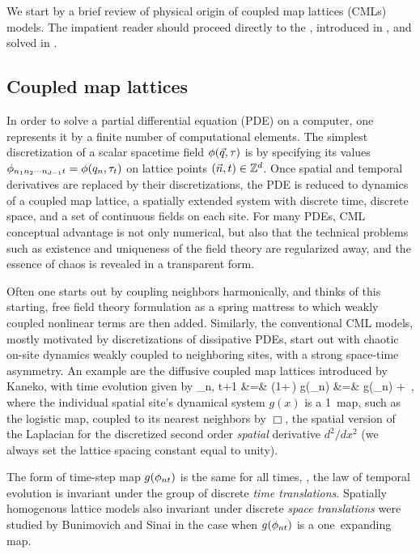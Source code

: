 We start by a
brief review of physical origin of coupled map lattices (CMLs) models.
The impatient reader should proceed directly to the
{\catlatt}, introduced in , and solved in
.

\subsection{Coupled map lattices}
\label{s:CCMs}

In order to solve a partial differential equation (PDE) on a computer,
one represents it by a finite number
of computational elements. The simplest discretization of a scalar
spacetime field $\phi(\vec{q},\tau)$ is by specifying its values
$\phi_{n_1n_2\cdots{n_{d-1}}t}= \phi(q_n,\tau_t)$ on lattice points
$(\vec{n},t) \in \mathbb{Z}^{d}$. Once spatial and temporal derivatives
are replaced by their discretizations, the PDE is
reduced to dynamics of a coupled map lattice, a spatially extended system
with discrete time, discrete space, and a set of continuous fields
on each site. For many PDEs, CML conceptual advantage is not only numerical,
but also that the technical problems such as existence and uniqueness of
the field theory are regularized away, and the essence of {\spt} chaos is
revealed in a transparent form.

Often one starts out by coupling neighbors harmonically, and
thinks of this starting, free field theory formulation as a spring
mattress to which  weakly coupled nonlinear terms are then
added. Similarly, the conventional CML models, mostly motivated by
discretizations of dissipative PDEs, start out with chaotic on-site
dynamics weakly coupled to neighboring sites, with a strong space-time
asymmetry. An example are the diffusive coupled map lattices introduced by
Kaneko, with time evolution given by
\bea
\ssp_{n, t+1}
    &=&     (1+\epsilon\,\Box) g(\ssp_{n\zeit})
           \continue
    &=&    g(\ssp_{n\zeit}) + 
\,,
\label{KanekoCML}
\eea
where the individual spatial site's dynamical system $g(x)$ is a 1\dmn\
map, such as the logistic map, coupled to its nearest neighbors by
$\Box$, the spatial version of the Laplacian \refeq{PerViv2.2} for the
discretized second order \emph{spatial} derivative ${d^2}/{dx^2}$ (we
always set the lattice spacing constant equal to unity).

The form of time-step map $g(\phi_{nt})$ is the same for all times, \ie, the
law of temporal evolution is invariant under the group of  discrete
\emph{time translations}.
Spatially homogenous lattice models also invariant under discrete \emph{space
translations} were studied by Bunimovich and Sinai\rf{BunSin88} in the case
when  $g(\phi_{nt})$  is a one\dmn\ expanding map.

